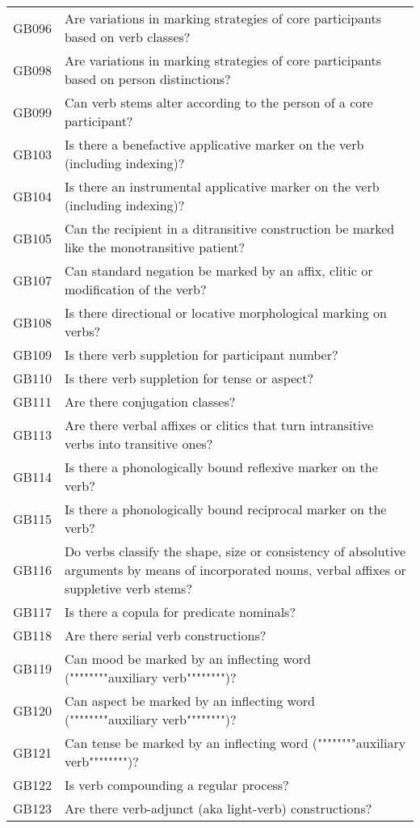 \begin{longtable}{p{3cm}p{12cm}}
  GB096 & Are variations in marking strategies of core participants based on verb classes? \\ 
  GB098 & Are variations in marking strategies of core participants based on person distinctions? \\ 
  GB099 & Can verb stems alter according to the person of a core participant? \\ 
  GB103 & Is there a benefactive applicative marker on the verb (including indexing)? \\ 
  GB104 & Is there an instrumental applicative marker on the verb (including indexing)? \\ 
  GB105 & Can the recipient in a ditransitive construction be marked like the monotransitive patient? \\ 
  GB107 & Can standard negation be marked by an affix, clitic or modification of the verb? \\ 
  GB108 & Is there directional or locative morphological marking on verbs? \\ 
  GB109 & Is there verb suppletion for participant number? \\ 
  GB110 & Is there verb suppletion for tense or aspect? \\ 
  GB111 & Are there conjugation classes? \\ 
  GB113 & Are there verbal affixes or clitics that turn intransitive verbs into transitive ones? \\ 
  GB114 & Is there a phonologically bound reflexive marker on the verb? \\ 
  GB115 & Is there a phonologically bound reciprocal marker on the verb? \\ 
  GB116 & Do verbs classify the shape, size or consistency of absolutive arguments by means of incorporated nouns, verbal affixes or suppletive verb stems? \\ 
  GB117 & Is there a copula for predicate nominals? \\ 
  GB118 & Are there serial verb constructions? \\ 
  GB119 & Can mood be marked by an inflecting word (""""""""auxiliary verb"""""""")? \\ 
  GB120 & Can aspect be marked by an inflecting word (""""""""auxiliary verb"""""""")? \\ 
  GB121 & Can tense be marked by an inflecting word (""""""""auxiliary verb"""""""")? \\ 
  GB122 & Is verb compounding a regular process? \\ 
  GB123 & Are there verb-adjunct (aka light-verb) constructions? \\ 

\end{longtable}
